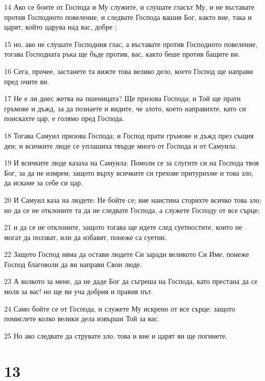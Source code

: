 \par 14 Ако се боите от Господа и Му служите, и слушате гласът Му, и не въставате против Господното повеление, и следвате Господа вашия Бог, както вие, така и царят, който царува над вас, добре ;
\par 15 но, ако не слушате Господния глас, а въставате против Господното повеление, тогава Господната ръка ще бъде против, вас, както беше против бащите ви.
\par 16 Сега, прочее, застанете та вижте това велико дело, което Господ ще направи пред очите ви.
\par 17 Не е ли днес жетва на пшеницата? Ще призова Господа; и Той ще прати гръмове и дъжд, за да познаете и видите, че злото, което направихте, като си поискахте цар, е голямо пред Господа.
\par 18 Тогава Самуил призова Господа; и Господ прати гръмове и дъжд през същия ден; и всичките люде се уплашиха твърде много от Господа и от Самуила.
\par 19 И всичките люде казаха на Самуила: Помоли се за слугите си на Господа твоя Бог, за да не измрем; защото върху всичките си грехове притурихме и това зло, да искаме за себе си цар.
\par 20 И Самуил каза на людете: Не бойте се; вие наистина сторихте всичко това зло; но да се не отклоните та да не следвате Господа, а служете Господу от все сърце;
\par 21 и да се не отклоните, защото тогава ще идете след суетностите, които не могат да ползват, или да избавят, понеже са суетни.
\par 22 Защото Господ няма да остави людете Си заради великото Си Име, понеже Господ благоволи да ви направи Свои люде.
\par 23 А колкото за мене, да не даде Бог да съгреша на Господа, като престана да се моля за вас! но ще ви уча добрия и правия път.
\par 24 Само бойте се от Господа, и служете Му искрено от все сърце; защото помислете колко велики дела извърши Той за вас.
\par 25 Но ако следвате да струвате зло, това и вие и царят ви ще погинете.

\chapter{13}

